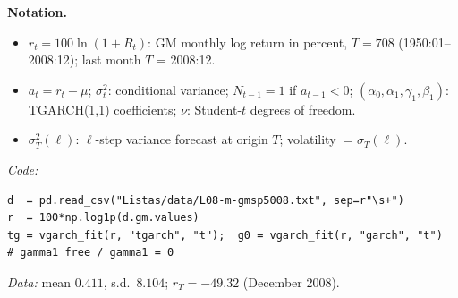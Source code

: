 \documentclass[11pt,a4paper]{article}
\newenvironment{notacao}{\par\smallskip\noindent\textbf{Notation.}\begin{itemize}[leftmargin=1.4em,topsep=1pt,itemsep=0pt]\small}{\end{itemize}}
\begin{document}
\begin{sol}
\begin{notacao}
\item $r_t=100\ln(1+R_t)$: GM monthly log return in percent, $T=708$ (1950:01--2008:12); last month $T$ = 2008:12.
\item $a_t=r_t-\mu$; $\sigma_t^2$: conditional variance; $N_{t-1}=1$ if $a_{t-1}<0$; $(\alpha_0,\alpha_1,\gamma_1,\beta_1)$: TGARCH(1,1) coefficients; $\nu$: Student-$t$ degrees of freedom.
\item $\sigma_T^2(\ell)$: $\ell$-step variance forecast at origin $T$; volatility $=\sigma_T(\ell)$.
\end{notacao}
\noindent\textit{Code:}
\begingroup\footnotesize
\begin{verbatim}
d  = pd.read_csv("Listas/data/L08-m-gmsp5008.txt", sep=r"\s+")
r  = 100*np.log1p(d.gm.values)
tg = vgarch_fit(r, "tgarch", "t");  g0 = vgarch_fit(r, "garch", "t")   # gamma1 free / gamma1 = 0
\end{verbatim}
\endgroup
\noindent\textit{Data:} mean $0.411$, s.d.\ $8.104$; $r_T=-49.32$ (December 2008).


\end{sol}
\end{document}
